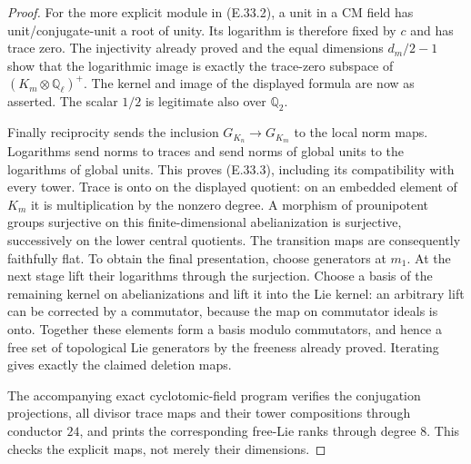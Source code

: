 \begin{proof}
For the more explicit module in (E.33.2), a unit in a CM field has
unit/conjugate-unit a root of unity. Its logarithm is therefore
fixed by $c$ and has trace zero. The injectivity already proved
and the equal dimensions $d_m/2-1$ show that the logarithmic image
is exactly the trace-zero subspace of
$(K_m\otimes\mathbb Q_\ell)^+$. The kernel and image of the
displayed formula are now as asserted. The scalar $1/2$ is
legitimate also over $\mathbb Q_2$.

Finally reciprocity sends the inclusion $G_{K_n}\to G_{K_m}$
to the local norm maps. Logarithms send norms to traces and send
norms of global units to the logarithms of global units. This
proves (E.33.3), including its compatibility with every tower.
Trace is onto on the displayed quotient: on an embedded element
of $K_m$ it is multiplication by the nonzero degree. A morphism
of prounipotent groups surjective on this finite-dimensional
abelianization is surjective, successively on the lower central
quotients. The transition maps are consequently faithfully flat.
To obtain the final presentation, choose generators at $m_1$.
At the next stage lift their logarithms through the surjection.
Choose a basis of the remaining kernel on abelianizations and
lift it into the Lie kernel: an arbitrary lift can be corrected
by a commutator, because the map on commutator ideals is onto.
Together these elements form a basis modulo commutators, and hence
a free set of topological Lie generators by the freeness already
proved. Iterating gives exactly the claimed deletion maps.

The accompanying exact cyclotomic-field program verifies the
conjugation projections, all divisor trace maps and their tower
compositions through conductor $24$, and prints the corresponding
free-Lie ranks through degree $8$. This checks the explicit maps,
not merely their dimensions.
\end{proof}
